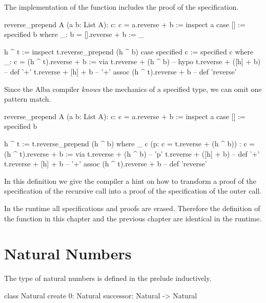 The implementation of the function includes the proof of the specification.

\begin{alba}
  reverse_prepend A (a b: List A): {c: c = a.reverse + b} :=
    inspect a case
      [] :=
        specified b where
          _: b = [].reverse + b := _

      h ^ t :=
        inspect t.reverse_prepend (h ^ b) case
          specified c :=
            specified c where
              _: c = (h ^ t).reverse + b :=
                via t.reverse + (h ^ b)      -- hypo
                    t.reverse + ([h] + b)    -- def '+'
                    t.reverse + [h] + b      -- '+' assoc
                    (h ^ t).reverse + b      -- def 'reverse'
\end{alba}


Since the Alba compiler \emph{knows} the mechanics of a specified type, we can
omit one pattern match.

\begin{alba}
  reverse_prepend A (a b: List A): {c: c = a.reverse + b} :=
    inspect a case
      [] :=
        specified b

      h ^ t :=
        t.reverse_prepend (h ^ b) where
          _ c (p: c = t.reverse + (h ^ b))
            : c = (h ^ t).reverse + b :=
             via t.reverse + (h ^ b)      -- 'p'
                 t.reverse + ([h] + b)    -- def '+'
                 t.reverse + [h] + b      -- '+' assoc
                 (h ^ t).reverse + b      -- def 'reverse'
\end{alba}

In this definition we give the compiler a hint on how to transform a proof of
the specification of the recursive call into a proof of the specification of
the outer call.

In the runtime all specifications and proofs are erased. Therefore the
definition of the function  in this chapter and the
previous chapter are identical in the runtime.








\section{Natural Numbers}


The type of natural numbers is defined in the prelude inductively.

\begin{alba}
  class Natural create
    0: Natural
    successor: Natural -> Natural
\end{alba}

